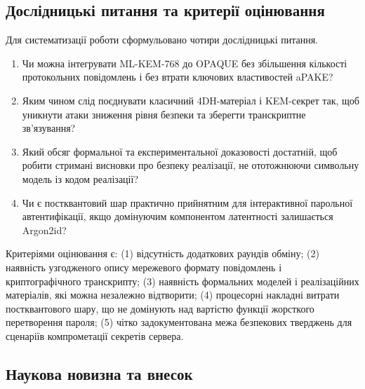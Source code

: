 \documentclass{llncs}
\begin{document}
\subsection{Дослідницькі питання та критерії оцінювання}

Для систематизації роботи сформульовано чотири дослідницькі питання.
\begin{enumerate}
  \item[\textbf{RQ1}] Чи можна інтегрувати ML-KEM-768 до OPAQUE без
        збільшення кількості протокольних повідомлень і без втрати
        ключових властивостей aPAKE?
  \item[\textbf{RQ2}] Яким чином слід поєднувати класичний 4DH-матеріал і
        KEM-секрет так, щоб уникнути атаки зниження рівня безпеки та
        зберегти транскриптне зв'язування?
  \item[\textbf{RQ3}] Який обсяг формальної та експериментальної
        доказовості достатній, щоб робити стримані висновки про безпеку
        реалізації, не ототожнюючи символьну модель із кодом реалізації?
  \item[\textbf{RQ4}] Чи є постквантовий шар практично прийнятним для
        інтерактивної парольної автентифікації, якщо домінуючим
        компонентом латентності залишається Argon2id?
\end{enumerate}

Критеріями оцінювання є: (1) відсутність додаткових раундів обміну;
(2) наявність узгодженого опису мережевого формату повідомлень і криптографічного
транскрипту; (3) наявність формальних моделей і реалізаційних матеріалів, які
можна незалежно відтворити; (4) процесорні накладні витрати постквантового шару, що не
домінують над вартістю функції жорсткого перетворення пароля; (5)
чітко задокументована межа безпекових тверджень для сценаріїв
компрометації секретів сервера.

\subsection{Наукова новизна та внесок}
\end{document}
